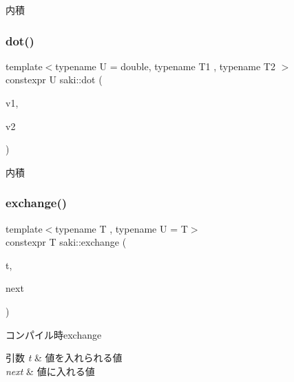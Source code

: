 内積 

\mbox{\label{namespacesaki_ad5009f6ca6c3f6c430fa9b8c889b6ee8}} 
\subsubsection{\texorpdfstring{dot()}{dot()}\hspace{0.1cm}{\footnotesize\ttfamily [3/3]}}
{\footnotesize\ttfamily template$<$typename U  = double, typename T1 , typename T2 $>$ \\
constexpr U saki\+::dot (\begin{DoxyParamCaption}\item[{const \mbox{\hyperlink{classsaki_1_1_vector4}{Vector4}}$<$ T1 $>$ \&}]{v1,  }\item[{const \mbox{\hyperlink{classsaki_1_1_vector4}{Vector4}}$<$ T2 $>$ \&}]{v2 }\end{DoxyParamCaption})}



内積 

\mbox{\label{namespacesaki_ad2deeae63db0667c034ff616bf6e3886}} 
\subsubsection{\texorpdfstring{exchange()}{exchange()}}
{\footnotesize\ttfamily template$<$typename T , typename U  = T$>$ \\
constexpr T saki\+::exchange (\begin{DoxyParamCaption}\item[{T \&}]{t,  }\item[{U}]{next }\end{DoxyParamCaption})}



コンパイル時exchange 


\begin{DoxyParams}{引数}
{\em t} & 値を入れられる値 \\
\hline
{\em next} & 値に入れる値 \\
\hline
\end{DoxyParams}
\mbox{\label{namespacesaki_a59cd7e099937e5f8bcf5aa612745690c}} 
